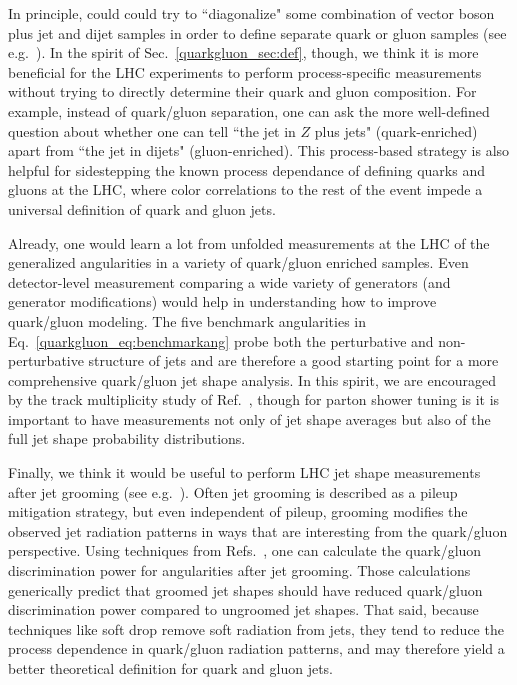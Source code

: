 \documentclass[11pt]{cernrep}
\begin{document}
In principle, could could try to ``diagonalize" some combination of vector boson plus jet and dijet samples in order to define separate quark or gluon samples (see e.g.~\cite{Aad:2014gea}).  In the spirit of Sec.~\ref{quarkgluon_sec:def}, though, we think it is more beneficial for the LHC experiments to perform process-specific measurements without trying to directly determine their quark and gluon composition.  For example, instead of quark/gluon separation, one can ask the more well-defined question about whether one can tell ``the jet in $Z$ plus jets" (quark-enriched) apart from ``the jet in dijets" (gluon-enriched).  This process-based strategy is also helpful for sidestepping the known process dependance of defining quarks and gluons at the LHC, where color correlations to the rest of the event impede a universal definition of quark and gluon jets.

Already, one would learn a lot from unfolded measurements at the LHC  of the generalized angularities in a variety of quark/gluon enriched samples.  Even detector-level measurement comparing a wide variety of generators (and generator modifications) would help in understanding how to improve quark/gluon modeling.   The five benchmark angularities in Eq.~\eqref{quarkgluon_eq:benchmarkang} probe both the perturbative and non-perturbative structure of jets and are therefore a good starting point for a more comprehensive quark/gluon jet shape analysis.  In this spirit, we are encouraged by the track multiplicity study of Ref.~\cite{Aad:2016oit}, though for parton shower tuning is it is important to have measurements not only of jet shape averages but also of the full jet shape probability distributions.

Finally, we think it would be useful to perform LHC jet shape measurements after jet grooming (see e.g.~\cite{Butterworth:2008iy,Ellis:2009su,Ellis:2009me,Krohn:2009th}).  Often jet grooming is described as a pileup mitigation strategy, but even independent of pileup, grooming modifies the observed jet radiation patterns in ways that are interesting from the quark/gluon perspective.  Using techniques from Refs.~\cite{Dasgupta:2013ihk,Larkoski:2014wba}, one can calculate the quark/gluon discrimination power for angularities after jet grooming.  Those calculations generically predict that groomed jet shapes should have reduced quark/gluon discrimination power compared to ungroomed jet shapes.  That said, because techniques like soft drop \cite{Larkoski:2014wba} remove soft radiation from jets, they tend to reduce the process dependence in quark/gluon radiation patterns, and may therefore yield a better theoretical definition for quark and gluon jets.
\end{document}
